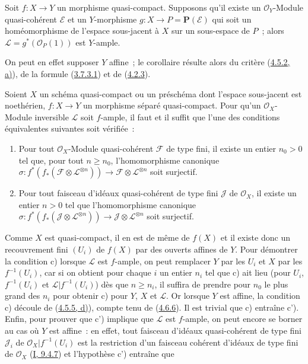\begin{corollary}[4.6.7]
\label{II.4.6.7-fr}
Soit $f:X\to Y$ un morphisme quasi-compact. Supposons qu'il existe un
$\mathcal{O}_Y$-Module quasi-cohérent $\mathcal{E}$ et un $Y$-morphisme
$g:X\to P=\mathbf{P}(\mathcal{E})$ qui soit un homéomorphisme de l'espace
sous-jacent à $X$ sur un sous-espace de $P$~; alors
$\mathcal{L}=g^*(\mathcal{O}_P(1))$ est $Y$-ample.
\end{corollary}

On peut en effet supposer $Y$ affine~; le corollaire résulte alors du
critère (\hyperref[II.4.5.2-fr]{4.5.2, a)}), de la formule
(\hyperref[II.3.7.3.1-fr]{3.7.3.1}) et de
(\hyperref[II.4.2.3-fr]{4.2.3}).

\begin{proposition}[4.6.8]
\label{II.4.6.8-fr}
Soient $X$ un schéma quasi-compact ou un préschéma dont l'espace
sous-jacent est noethérien, $f:X\to Y$ un morphisme séparé quasi-compact.
Pour qu'un $\mathcal{O}_X$-Module inversible $\mathcal{L}$ soit $f$-ample,
il faut et il suffit que l'une des conditions équivalentes suivantes soit
vérifiée~:
\begin{enumerate}
  \item[\rm{c)}] Pour tout $\mathcal{O}_X$-Module quasi-cohérent
  $\mathcal{F}$ de type fini, il existe un entier $n_0>0$ tel que, pour
  tout $n\geq n_0$, l'homomorphisme canonique
  $\sigma:f^*(f_*(\mathcal{F}\otimes\mathcal{L}^{\otimes n}))\to
  \mathcal{F}\otimes\mathcal{L}^{\otimes n}$ soit surjectif.
  \item[\rm{c')}] Pour tout faisceau d'idéaux quasi-cohérent de type fini
  $\mathcal{J}$ de $\mathcal{O}_X$, il existe un entier $n>0$ tel que
  l'homomorphisme canonique
  $\sigma:f^*(f_*(\mathcal{J}\otimes\mathcal{L}^{\otimes n}))\to
  \mathcal{J}\otimes\mathcal{L}^{\otimes n}$ soit surjectif.
\end{enumerate}
\end{proposition}

Comme $X$ est quasi-compact, il en est de même de $f(X)$ et il existe donc
un recouvrement fini $(U_i)$ de $f(X)$ par des ouverts affines de $Y$. Pour
démontrer la condition c) lorsque $\mathcal{L}$ est $f$-ample, on peut
remplacer $Y$ par les $U_i$ et $X$ par les $f^{-1}(U_i)$, car si on obtient
pour chaque $i$ un entier $n_i$ tel que c) ait lieu (pour $U_i$,
$f^{-1}(U_i)$ et $\mathcal{L}|f^{-1}(U_i)$) dès que $n\geq n_i$, il
suffira de prendre pour $n_0$ le plus grand des $n_i$ pour obtenir c) pour
$Y$, $X$ et $\mathcal{L}$. Or lorsque $Y$ est affine, la condition c)
découle de (\hyperref[II.4.5.5-fr]{4.5.5, d)}), compte tenu de
(\hyperref[II.4.6.6-fr]{4.6.6}). Il est trivial que c) entraîne c'). Enfin,
pour prouver que c') implique que $\mathcal{L}$ est $f$-ample, on peut
encore se borner au cas où $Y$ est affine~: en effet, tout faisceau
d'idéaux quasi-cohérent de type fini $\mathcal{J}_i$ de
$\mathcal{O}_X|f^{-1}(U_i)$ est la restriction d'un faisceau cohérent
d'idéaux de type fini de $\mathcal{O}_X$
(\hyperref[I.9.4.7-fr]{I, 9.4.7}) et l'hypothèse c') entraîne que

